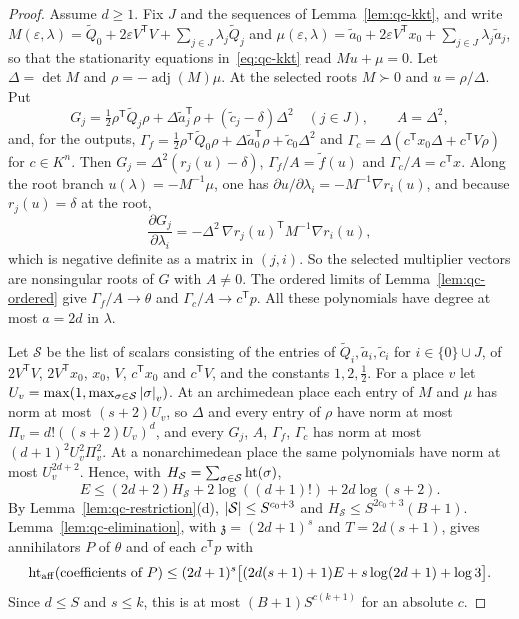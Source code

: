 \begin{proof}
Assume $d\ge1$. Fix $J$ and the sequences of Lemma~\ref{lem:qc-kkt}, and write
$M(\varepsilon,\lambda)=\tilde Q_0+2\varepsilon V^{\mathsf T}V+
\sum_{j\in J}\lambda_j\tilde Q_j$ and
$\mu(\varepsilon,\lambda)=\tilde a_0+2\varepsilon V^{\mathsf T}x_0+
\sum_{j\in J}\lambda_j\tilde a_j$, so that the stationarity equations
in~\eqref{eq:qc-kkt} read $Mu+\mu=0$. Let $\Delta=\det M$ and
$\rho=-\operatorname{adj}(M)\mu$. At the selected roots $M\succ0$ and
$u=\rho/\Delta$. Put
\[
G_j=\tfrac12\rho^{\mathsf T}\tilde Q_j\rho+\Delta\tilde a_j^{\mathsf T}\rho
+(\tilde c_j-\delta)\Delta^2\quad(j\in J),\qquad A=\Delta^2,
\]
and, for the outputs, $\Gamma_f=\tfrac12\rho^{\mathsf T}\tilde Q_0\rho+
\Delta\tilde a_0^{\mathsf T}\rho+\tilde c_0\Delta^2$ and
$\Gamma_c=\Delta(c^{\mathsf T}x_0\Delta+c^{\mathsf T}V\rho)$ for $c\in K^n$.
Then $G_j=\Delta^2(r_j(u)-\delta)$, $\Gamma_f/A=\tilde f(u)$ and
$\Gamma_c/A=c^{\mathsf T}x$. Along the root branch
$u(\lambda)=-M^{-1}\mu$, one has $\partial u/\partial\lambda_i=
-M^{-1}\nabla r_i(u)$, and because $r_j(u)=\delta$ at the root,
\[
\frac{\partial G_j}{\partial\lambda_i}=
-\Delta^2\,\nabla r_j(u)^{\mathsf T}M^{-1}\nabla r_i(u),
\]
which is negative definite as a matrix in $(j,i)$. So the selected multiplier
vectors are nonsingular roots of $G$ with $A\ne0$. The ordered limits of
Lemma~\ref{lem:qc-ordered} give $\Gamma_f/A\to\theta$ and
$\Gamma_c/A\to c^{\mathsf T}p$.
All these polynomials have degree at most $a=2d$ in $\lambda$.

Let $\mathcal S$ be the list of scalars consisting of the entries of
$\tilde Q_i,\tilde a_i,\tilde c_i$ for $i\in\{0\}\cup J$, of
$2V^{\mathsf T}V$, $2V^{\mathsf T}x_0$, $x_0$, $V$, $c^{\mathsf T}x_0$ and
$c^{\mathsf T}V$, and the constants $1,2,\tfrac12$. For a place $v$ let $U_v=\max(1,\max_{\sigma\in\mathcal S}
\left\lvert\sigma\right\rvert_v)$. At an archimedean place each entry of $M$ and $\mu$ has norm
at most $(s+2)U_v$, so $\Delta$ and every entry of $\rho$ have norm at most
$\Pi_v=d!((s+2)U_v)^d$, and every $G_j$, $A$, $\Gamma_f$, $\Gamma_c$ has norm
at most $(d+1)^2U_v^2\Pi_v^2$. At a nonarchimedean place the same polynomials
have norm at most $U_v^{2d+2}$. Hence, with
$H_{\mathcal S}=\sum_{\sigma\in\mathcal S}\operatorname{ht}(\sigma)$,
\[
E\le(2d+2)H_{\mathcal S}+2\log((d+1)!)+2d\log(s+2).
\]
By Lemma~\ref{lem:qc-restriction}(d), $\left\lvert\mathcal S\right\rvert\le S^{c_0+3}$ and
$H_{\mathcal S}\le S^{2c_0+3}(B+1)$. Lemma~\ref{lem:qc-elimination}, with
$\mathfrak z=(2d+1)^s$ and $T=2d(s+1)$, gives annihilators $P$ of $\theta$ and of each
$c^{\mathsf T}p$ with
\[
\operatorname{ht}_{\rm aff}(\text{coefficients of }P)\le
(2d+1)^s\bigl[(2d(s+1)+1)E+s\log(2d+1)+\log3\bigr].
\]
Since $d\le S$ and $s\le k$, this is at most $(B+1)S^{c(k+1)}$ for an
absolute $c$.


\end{proof}
